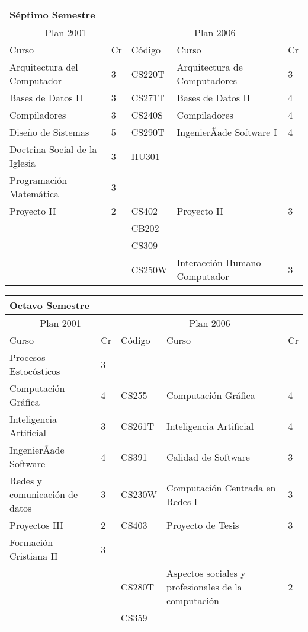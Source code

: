 \begin{center}
\begin{tabularx}{0.95\textwidth}{|p{4cm}|p{1cm}||p{2cm}|X|p{1cm}|}\hline
\multicolumn{5}{|l|}{\textbf{Séptimo Semestre}} \\ \hline
\multicolumn{2}{|c|}{Plan 2001} & \multicolumn{3}{|c|}{Plan 2006} \\ \hline
Curso & Cr & Código & Curso & Cr \\ \hline
Arquitectura del Computador & 3 & CS220T & Arquitectura de Computadores & 3 \\ \hline
Bases de Datos II & 3 & CS271T & Bases de Datos II & 4 \\ \hline
Compiladores & 3 & CS240S & Compiladores & 4 \\ \hline
Diseño de Sistemas & 5 & CS290T & IngenierÃ­ade Software I & 4 \\ \hline
Doctrina Social de la Iglesia & 3 & HU301 &  & \\ \hline
Programación Matemática & 3 &  &  & \\ \hline
Proyecto II & 2 & CS402 & Proyecto II & 3 \\ \hline
 &  & CB202 &  & \\ \hline
 &  & CS309 &  & \\ \hline
 &  & CS250W & Interacción Humano Computador & 3 \\ \hline
\end{tabularx}
\end{center}

\begin{center}
\begin{tabularx}{0.95\textwidth}{|p{4cm}|p{1cm}||p{2cm}|X|p{1cm}|}\hline
\multicolumn{5}{|l|}{\textbf{Octavo Semestre}} \\ \hline
\multicolumn{2}{|c|}{Plan 2001} & \multicolumn{3}{|c|}{Plan 2006} \\ \hline
Curso & Cr & Código & Curso & Cr \\ \hline
Procesos Estocósticos & 3 &  &  & \\ \hline
Computación Gráfica & 4 & CS255 & Computación Gráfica & 4 \\ \hline
Inteligencia Artificial & 3 & CS261T & Inteligencia Artificial & 4 \\ \hline
IngenierÃ­ade Software & 4 & CS391 & Calidad de Software & 3 \\ \hline
Redes y comunicación de datos & 3 & CS230W & Computación Centrada en Redes I & 3 \\ \hline
Proyectos III & 2 & CS403 & Proyecto de Tesis & 3 \\ \hline
Formación Cristiana II & 3 &  &  & \\ \hline
 &  & CS280T & Aspectos sociales y profesionales de la computación& 2 \\ \hline
 &  & CS359 &  & \\ \hline
\end{tabularx}
\end{center}

